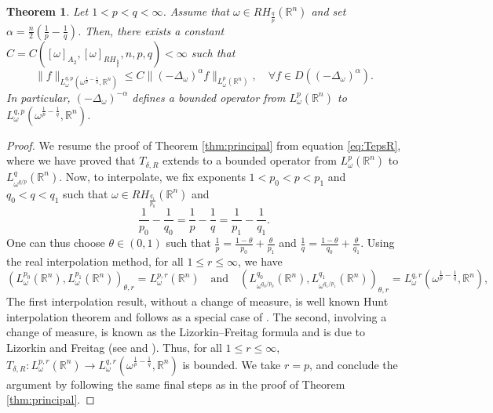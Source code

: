 \documentclass[12pt, letterpaper]{amsart}
\newtheorem{thm}{Theorem}[section]
\theoremstyle{definition}
\theoremstyle{remark}
\numberwithin{equation}{section}
\begin{document}
{\begin{thm}\label{thm:principal*}
   Let $1<p<q<\infty$. Assume that $\omega \in RH_{\frac{q}{p}}(\mathbb{R}^n)$ and set $\alpha=\frac{n}{2}(\frac{1}{p}-\frac{1}{q})$. Then, there exists a constant $C = C([ \omega  ]_{A_2},[ \omega  ]_{RH_{\frac{q}{p}}},n,p,q)<\infty$ such that
    \begin{equation*}
        \| f \|_{L^{q,p}_{\omega}(\omega^{\frac{1}{p}-\frac{1}{q}}, \mathbb{R}^n)} \leq C \| (-\Delta_\omega)^\alpha f \|_{L^p_{\omega}(\mathbb{R}^n)}, \quad \forall f \in D((-\Delta_\omega)^\alpha).
    \end{equation*}
    In particular, $(-\Delta_\omega)^{-\alpha}$ defines a bounded operator from $L^p_\omega(\mathbb{R}^n)$ to $L^{q,p}_{\omega}(\omega^{\frac{1}{p}-\frac{1}{q}}, \mathbb{R}^n)$.
\end{thm}
\begin{proof}
    We resume the proof of Theorem \ref{thm:principal} from equation \eqref{eq:TepsR}, where we have proved that $T_{\delta,R}$ extends to a bounded operator from $L^p_\omega(\mathbb{R}^n)$ to $ L^q_{\omega^{q/p}}(\mathbb{R}^n)$. Now, to interpolate, we fix exponents $1<p_0<p<p_1$ and $q_0<q<q_1$ such that $\omega \in RH_{\frac{q_1}{p_0}}(\mathbb{R}^n)$ and 
    $$ \frac{1}{p_0}-\frac{1}{q_0}=\frac{1}{p}-\frac{1}{q}=\frac{1}{p_1}-\frac{1}{q_1}.$$
    One can thus choose $\theta \in (0,1)$  such that $\frac{1}{p}=\frac{1-\theta}{p_0}+\frac{\theta}{p_1}$ and $\frac{1}{q}=\frac{1-\theta}{q_0}+\frac{\theta}{q_1}$.
    Using the real interpolation method, for all $1\le r \le \infty$, we have 
    \begin{equation*}
        \left ( L^{p_0}_{\omega}(\mathbb{R}^n), L^{p_1}_{\omega}(\mathbb{R}^n) \right )_{\theta,r}=L^{p,r}_\omega(\mathbb{R}^n) \quad \text{and} \quad  ( L^{q_0}_{\omega^{q_0/p_0}}(\mathbb{R}^n), L^{q_1}_{\omega^{q_1/p_1}}(\mathbb{R}^n) )_{\theta,r}=L^{q,r}_\omega(\omega^{\frac{1}{p}-\frac{1}{q}},\mathbb{R}^n),
    \end{equation*}
     The first interpolation result, without a change of measure, is well known Hunt interpolation theorem and follows as a special case of \cite[Theorem 5.3.1]{bergh2012interpolation}. The second, involving a change of measure, is known as the Lizorkin–Freitag formula and is due to Lizorkin and Freitag (see \cite[Theorem 2]{Freitag1978} and \cite{Lizorkin1975}). Thus, for all $1\le r \le \infty$, $T_{\delta,R}: L^{p,r}_\omega(\mathbb{R}^n) \rightarrow L^{q,r}_\omega(\omega^{\frac{1}{p}-\frac{1}{q}},\mathbb{R}^n)$ is bounded. We take $r=p$, and conclude the argument by following the same final steps as in the proof of Theorem \ref{thm:principal}.

\end{proof}}
\end{document}

